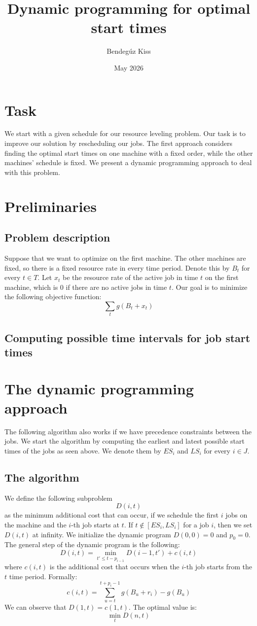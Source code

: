 \documentclass{article}
\title{Dynamic programming for optimal start times}
\author{Bendegúz Kiss}
\date{May 2026}
\begin{document}
\maketitle

\section{Task}
We start with a given schedule for our resource leveling problem. Our task is to improve our solution by rescheduling our jobs. The first approach considers finding the optimal start times on one machine with a fixed order, while the other machines' schedule is fixed. We present a dynamic programming approach to deal with this problem.

\section{Preliminaries}

\subsection{Problem description}
Suppose that we want to optimize on the first machine. The other machines are fixed, so there is a fixed resource rate in every time period. Denote this by $B_t$ for every $t \in T$. Let $x_t$ be the resource rate of the active job in time $t$ on the first machine, which is 0 if there are no active jobs in time $t$. Our goal is to minimize the following objective function:
$$\sum_t g(B_t+x_t)$$

\subsection{Computing possible time intervals for job start times}

\section{The dynamic programming approach}
The following algorithm also works if we have precedence constraints between the jobs. We start the algorithm by computing the earliest and latest possible start times of the jobs as seen above. We denote them by $ES_i$ and $LS_i$ for every $i \in J$. 

\subsection{The algorithm}
We define the following subproblem 
$$D(i,t)$$
as the minimum additional cost that can occur, if we schedule the first $i$ jobs on the machine and the $i$-th job starts at $t$. If $t \notin [ES_i,LS_i]$ for a job $i$, then we set $D(i,t)$ at infinity. We initialize the dynamic program $D(0,0) = 0$ and $p_0 = 0$. The general step of the dynamic program is the following:
$$D(i,t) = \min_{t' \leq t-p_{i-1}} D(i-1,t') + c(i,t)$$
where $c(i,t)$ is the additional cost that occurs when the $i$-th job starts from the $t$ time period. Formally:
$$c(i,t) = \sum_{u = t}^{t+p_i-1} g(B_u + r_i) - g(B_u)$$
We can observe that $D(1,t) = c(1,t)$. The optimal value is:
$$\min_{t} D(n,t)$$
\end{document}
